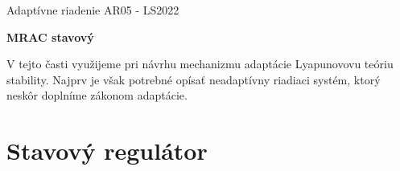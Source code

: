\documentclass[a4paper, 10pt, ]{article}
\def\oznacenieCasti{AR05 - LS2022}
\begin{document}
\lstset{%
style=mystyle,
rangebeginprefix=\#\#\#\ cellB\ ,%
rangebeginsuffix=\ \#\#\#,%
rangeendprefix=\#\#\#\ cellE\ ,%
rangeendsuffix=\ \#\#\#,%
includerangemarker=false,
}




\fontsize{12pt}{22pt}\selectfont

\centerline{\textsf{Adaptívne riadenie} \hfill \textsf{\oznacenieCasti}}

\fontsize{18pt}{22pt}\selectfont





\begin{flushleft}
    \textbf{\textsf{MRAC stavový}}
\end{flushleft}







\normalsize

\bigskip

{\hypersetup{hidelinks}

\tableofcontents

}

\bigskip

\vspace{18pt}






\noindent
\lettrine[lines=3, nindent=0pt]{V}{} tejto časti využijeme pri návrhu mechanizmu adaptácie Lyapunovovu teóriu stability. Najprv je však potrebné opísať neadaptívny riadiaci systém, ktorý neskôr doplníme zákonom adaptácie.












\section{Stavový regulátor}
\label{Stavový regulátor ($n=2$)}
\end{document}
